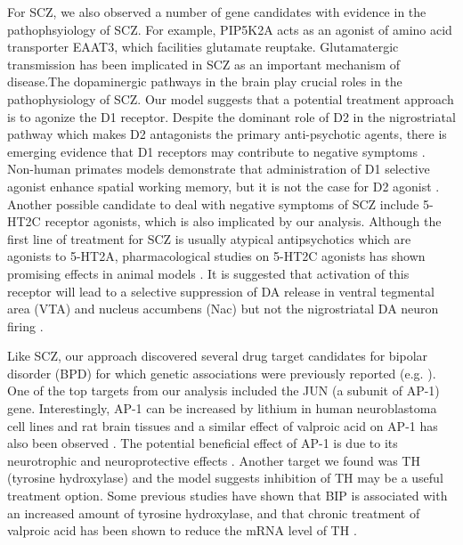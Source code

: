     For SCZ, we also observed a number of gene candidates with evidence in the pathophsyiology of SCZ. For example, PIP5K2A acts as an agonist of amino acid transporter EAAT3, which facilities glutamate reuptake. Glutamatergic transmission has been implicated in SCZ as an important mechanism of disease.The dopaminergic pathways in the brain play crucial roles in the pathophysiology of SCZ. Our model suggests that a potential treatment approach is to agonize the D1 receptor. Despite the dominant role of D2 in the nigrostriatal pathway  \cite{howes2009dopamine} which makes D2 antagonists the primary anti-psychotic agents, there is emerging evidence that D1 receptors may contribute to negative symptoms \cite{goldman2004targeting}. Non-human primates models demonstrate that administration of D1 selective agonist enhance spatial working memory, but it is not the case for D2 agonist \cite{goldman2004targeting}. Another possible  candidate to deal with negative symptoms of SCZ include 5-HT2C receptor agonists, which is also implicated by our analysis. Although the first line of treatment for SCZ is usually atypical antipsychotics which are agonists to 5-HT2A, pharmacological studies on 5-HT2C agonists has shown promising effects in animal models \cite{floresco2009neural,hemrick2002comparison,pogorelov20175}. It is suggested that activation of this receptor will lead to a selective suppression of DA release in  ventral tegmental area (VTA) and nucleus accumbens (Nac) but not the nigrostriatal  DA neuron firing \cite{meltzer20115}.
  
    Like SCZ, our approach discovered several drug target candidates for bipolar disorder (BPD) for which genetic associations were previously reported (e.g. \cite{lee2013pathway,zhang2015functional,golimbet2014study}). One of the top targets from our analysis included the JUN (a subunit of AP-1) gene. Interestingly, AP-1 can be increased by lithium in human neuroblastoma cell lines and rat brain tissues and a similar effect of valproic acid on AP-1 has also been observed \cite{yuan1998lithium,asghari1998differential,ozaki1997lithium}. The potential beneficial effect of AP-1 is due to its neurotrophic and neuroprotective effects \cite{machado2009role}. Another target we found was TH  (tyrosine hydroxylase) and the model suggests inhibition of TH may be a useful treatment option. Some previous studies have shown that BIP is associated with an increased amount of tyrosine hydroxylase, and that chronic treatment of valproic acid has been shown to reduce the mRNA level of TH \cite{pantazopoulos2004differences,muglia2002dopamine}. 

